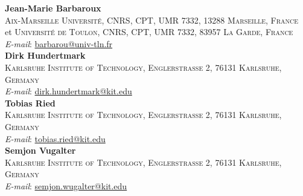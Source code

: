 \documentclass[11pt,a4paper,reqno]{amsart}
\theoremstyle{plain}
\theoremstyle{definition}
\begin{document}



\vfill \noindent
\textbf{Jean-Marie Barbaroux}\\
\textsc{Aix-Marseille Universit\'e, CNRS, CPT, UMR 7332, 13288 Marseille, France}\\
et \textsc{Universit\'e de Toulon, CNRS, CPT, UMR 7332, 83957 La Garde, France}\\
\textit{E-mail}: \href{mailto:barbarou@univ-tln.fr}{barbarou@univ-tln.fr}\\
\textbf{Dirk Hundertmark}\\
\textsc{Karlsruhe Institute of Technology, Englerstra{\ss}e 2, 76131 Karlsruhe, Germany}\\
\textit{E-mail}: \href{mailto:dirk.hundertmark@kit.edu}{dirk.hundertmark@kit.edu}\\
\textbf{Tobias Ried}\\
\textsc{Karlsruhe Institute of Technology, Englerstra{\ss}e 2, 76131 Karlsruhe, Germany}\\
\textit{E-mail}: \href{mailto:tobias.ried@kit.edu}{tobias.ried@kit.edu}\\
\textbf{Semjon Vugalter}\\
\textsc{Karlsruhe Institute of Technology, Englerstra{\ss}e 2, 76131 Karlsruhe, Germany}\\
\textit{E-mail}: \href{mailto:semjon.wugalter@kit.edu}{semjon.wugalter@kit.edu}
\end{document}
